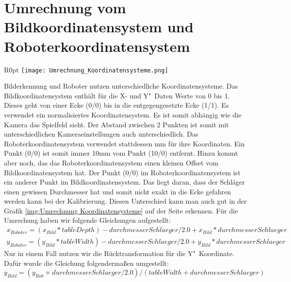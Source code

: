 \section{Umrechnung vom Bildkoordinatensystem und Roboterkoordinatensystem}

\begin{wrapfigure}{R}{0pt}
	\texttt{[image: Umrechnung\_Koordinatensysteme.png]}
	\vspace{-15pt}
	\caption{ Veranschaulichung der Koordinatensystemunterschiede}
	\label{img:Umrechnung Koordinatensysteme}
\end{wrapfigure}

Bilderkennung und Roboter nutzen unterschiedliche Koordinatensysteme. Das Bildkoordinatensystem enthält für die X- und Y"~Daten Werte von 0 bis 1. Dieses geht von einer Ecke (0/0) bis in die entgegengesetzte Ecke (1/1). Es verwendet ein normalisiertes Koordinatensystem. Es ist somit abhängig wie die Kamera das Spielfeld sieht. Der Abstand zwischen 2 Punkten ist somit mit unterschiedlichen Kameraeinstellungen auch unterschiedlich. Das Roboterkoordinatensystem verwendet stattdessen mm für ihre Koordinaten. Ein Punkt (0/0) ist somit immer 10mm vom Punkt (10/0) entfernt. Hinzu kommt aber noch, das das Roboterkoordinatensystem einen kleinen Offset vom Bildkoordinatensystem hat. Der Punkt (0/0) im Roboterkoordinatensystem ist ein anderer Punkt im Bildkoordinatensystem. Das liegt daran, dass der Schläger einen gewissen Durchmesser hat und somit nicht exakt in die Ecke gefahren werden kann bei der Kalibrierung. Diesen Unterschied kann man auch gut in der Grafik \ref{img:Umrechnung Koordinatensysteme} auf der Seite \pageref{img:Umrechnung Koordinatensysteme} erkennen. Für die Umrechung haben wir folgende Gleichungen aufgestellt:\\
$
\begin{array}{c}
x_{Roboter} = (x_{Bild} * tableDepth) - durchmesserSchlaeger / 2.0 + x_{Bild} * durchmesserSchlaeger \\
y_{Roboter} = (y_{Bild} * tableWidth) - durchmesserSchlaeger / 2.0 + y_{Bild} * durchmesserSchlaeger
\end{array}
$\\
Nur in einem Fall nutzen wir die Rücktransformation für die Y"~Koordinate. Dafür wurde die Gleichung folgendermaßen umgestellt:\\
$y_{Bild} = (y_{Rob} + durchmesserSchlaeger / 2.0) / (tableWidth +  durchmesserSchlaeger)$ 